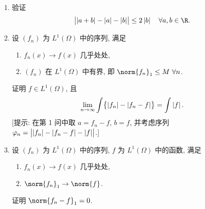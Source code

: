 \begin{exercise}
\label{exer:4.13}
\begin{enumerate}[label=\arabic*., leftmargin=2.2em, itemsep=0.35em]
	\item 验证
	      \begin{equation*}
	      \bigl|\abs{a+b}-\abs{a}-\abs{b}\bigr|\le2\abs{b}\quad\forall a,b\in\R.
	      \end{equation*}
	\item 设 $(f_n)$ 为 $L^1(\Omega)$ 中的序列, 满足
	      \begin{enumerate}[label=(\roman*), leftmargin=2.4em, itemsep=0.1em]
	      	\item $f_n(x)\to f(x)$ 几乎处处,
	      	\item $(f_n)$ 在 $L^1(\Omega)$ 中有界, 即 $\norm{f_n}_1\le M\ \forall n$.
	      \end{enumerate}
	      证明 $f\in L^1(\Omega)$, 且
	      \begin{equation*}
	      \lim_{n\to\infty}\int\bigl\{\left|f_n\right|-\left|f_n-f\right|\bigr\}=\int\left|f\right|.
	      \end{equation*}
	      [提示: 在第 1 问中取 $a=f_n-f$, $b=f$, 并考虑序列
	      $\varphi_n=\bigl|\left|f_n\right|-\left|f_n-f\right|-\left|f\right|\bigr|$.]
	\item 设 $(f_n)$ 为 $L^1(\Omega)$ 中的序列, $f$ 为 $L^1(\Omega)$ 中的函数, 满足
	      \begin{enumerate}[label=(\roman*), leftmargin=2.4em, itemsep=0.1em]
	      	\item $f_n(x)\to f(x)$ 几乎处处,
	      	\item $\norm{f_n}_1\to\norm{f}$.
	      \end{enumerate}
	      证明 $\norm{f_n-f}_1=0$.
\end{enumerate}
\end{exercise}

